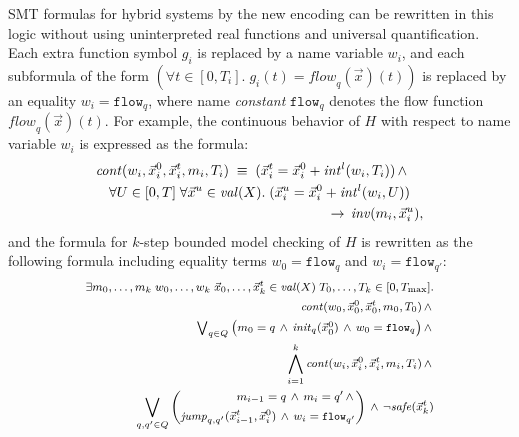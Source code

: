 SMT formulas for hybrid systems by the new encoding
can be rewritten in this logic without using uninterpreted real functions 
and universal quantification.
Each extra function symbol $g_i$ is replaced by a name variable $w_i$, and
each subformula of the form $(\forall t \in [0,T_i].\; g_i(t) = \mathit{flow}_q(\vec{x})(t))$
is replaced by an equality $w_i = \texttt{flow}_q$,
where name \emph{constant} $\texttt{flow}_q$ denotes the flow function $\mathit{flow}_q(\vec{x})(t)$.
For example, 
the continuous behavior of $H$ with respect to name variable $w_i$
is expressed as the formula:
\[
\begin{multlined}
\mathit{cont}(w_i, \vec{x}_i^0, \vec{x}_i^t, m_i, T_i) \;\equiv\;
(\vec{x}_i^t = \vec{x}_i^0 + \mathit{int}^l(w_i, T_i))
\,\wedge\,
\\
\forall U \in [0,T]\;
\forall \vec{x}^u \in \val(X).\;
(\vec{x}_i^u = \vec{x}_i^0 + \mathit{int}^l(w_i, U)) \\
\,\to\, \mathit{inv}(m_i,\vec{x}_i^u),
\end{multlined}
\]
and the formula for $k$-step bounded model checking of $H$
is rewritten as the following formula including equality terms  $w_0 = \texttt{flow}_q$ and $w_i = \texttt{flow}_{q'}$:
\[
\begin{medsize}
\begin{alignedat}{2}
\exists m_0,\ldots,m_k\;
 w_0,\ldots,w_k\;
 \vec{x}_0, \ldots, %
\vec{x}_k^t \in \val(X)\;
 T_0, \ldots, T_k \in [0,T_{\max}].
\\
\mathit{cont}(w_0, \vec{x}_0^0, \vec{x}_0^t, m_0, T_0)
\,\wedge\,
\\
\textstyle
\bigvee_{q \in Q}
\big(
m_0 = q 
\,\wedge\,
\mathit{init}_q(\vec{x}_0^0) 
\,\wedge\,
w_0 = \texttt{flow}_q
\big)
\,\wedge\,
\\
\bigwedge_{i = 1}^k 
\mathit{cont}(w_i,\vec{x}_i^0, \vec{x}_i^t, m_i, T_i)
\,\wedge\,
\\
\bigvee_{q, q' \in Q}
\left(
\begin{aligned}
m_{i-1} = {q}
\,\wedge\,
m_i = {q'}
\,\wedge\,
\\
\mathit{jump}_{q,q'}(\vec{x}_{i-1}^t,\vec{x}_{i}^0)
\,\wedge\,
w_i = \texttt{flow}_{q'}
\end{aligned}
\right)
\,\wedge\,
\neg \mathit{safe}(\vec{x}_k^t)
\end{alignedat}
\end{medsize}
\]


